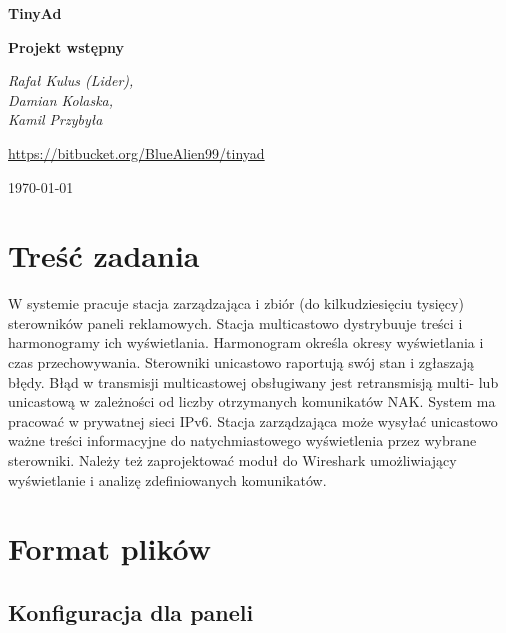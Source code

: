 \documentclass[12pt, a4paper]{article}
\begin{document}
\setlength{\parindent}{0pt}
\begin{titlepage}
    \centering
    \vspace{20cm}
    {\huge\bfseries TinyAd \unskip\strut\par}
    {\huge\bfseries Projekt wstępny \unskip\strut\par}
    \vspace{1cm}
    {\Large\itshape Rafał Kulus (Lider), \\Damian Kolaska, \\Kamil Przybyła \unskip\strut\par}
    \vspace{1cm}
    \href{https://bitbucket.org/BlueAlien99/tinyad}{https://bitbucket.org/BlueAlien99/tinyad}

    \vfill
    
    {\large \today\par}
\end{titlepage}
\tableofcontents
\clearpage

\hypertarget{treux15bux107-zadania}{%
\section{Treść zadania}\label{treux15bux107-zadania}}

W systemie pracuje stacja zarządzająca i zbiór (do kilkudziesięciu
tysięcy) sterowników paneli reklamowych. Stacja multicastowo dystrybuuje
treści i harmonogramy ich wyświetlania. Harmonogram określa okresy
wyświetlania i czas przechowywania. Sterowniki unicastowo raportują swój
stan i zgłaszają błędy. Błąd w transmisji multicastowej obsługiwany jest
retransmisją multi- lub unicastową w zależności od liczby otrzymanych
komunikatów NAK. System ma pracować w prywatnej sieci IPv6. Stacja
zarządzająca może wysyłać unicastowo ważne treści informacyjne do
natychmiastowego wyświetlenia przez wybrane sterowniki. Należy też
zaprojektować moduł do Wireshark umożliwiający wyświetlanie i analizę
zdefiniowanych komunikatów.

\hypertarget{format-plikuxf3w}{%
\section{Format plików}\label{format-plikuxf3w}}

\hypertarget{konfiguracja-dla-paneli}{%
\subsection{Konfiguracja dla paneli}\label{konfiguracja-dla-paneli}}
\end{document}
